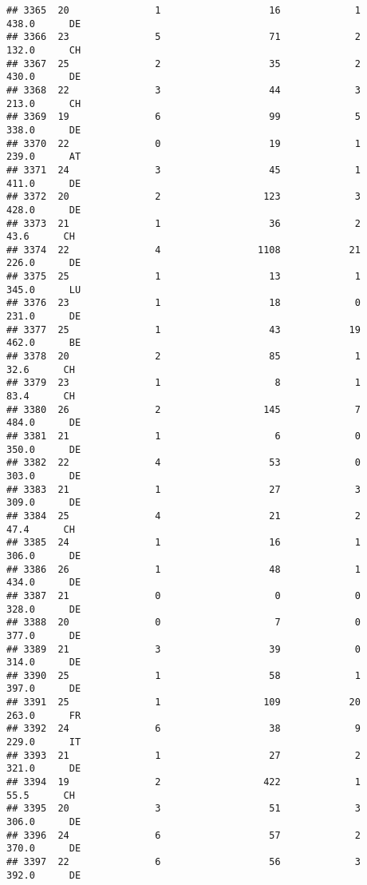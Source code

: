\documentclass[
]{article}
\begin{document}
\begin{verbatim}
## 3365  20               1                   16             1    438.0      DE
## 3366  23               5                   71             2    132.0      CH
## 3367  25               2                   35             2    430.0      DE
## 3368  22               3                   44             3    213.0      CH
## 3369  19               6                   99             5    338.0      DE
## 3370  22               0                   19             1    239.0      AT
## 3371  24               3                   45             1    411.0      DE
## 3372  20               2                  123             3    428.0      DE
## 3373  21               1                   36             2     43.6      CH
## 3374  22               4                 1108            21    226.0      DE
## 3375  25               1                   13             1    345.0      LU
## 3376  23               1                   18             0    231.0      DE
## 3377  25               1                   43            19    462.0      BE
## 3378  20               2                   85             1     32.6      CH
## 3379  23               1                    8             1     83.4      CH
## 3380  26               2                  145             7    484.0      DE
## 3381  21               1                    6             0    350.0      DE
## 3382  22               4                   53             0    303.0      DE
## 3383  21               1                   27             3    309.0      DE
## 3384  25               4                   21             2     47.4      CH
## 3385  24               1                   16             1    306.0      DE
## 3386  26               1                   48             1    434.0      DE
## 3387  21               0                    0             0    328.0      DE
## 3388  20               0                    7             0    377.0      DE
## 3389  21               3                   39             0    314.0      DE
## 3390  25               1                   58             1    397.0      DE
## 3391  25               1                  109            20    263.0      FR
## 3392  24               6                   38             9    229.0      IT
## 3393  21               1                   27             2    321.0      DE
## 3394  19               2                  422             1     55.5      CH
## 3395  20               3                   51             3    306.0      DE
## 3396  24               6                   57             2    370.0      DE
## 3397  22               6                   56             3    392.0      DE

\end{verbatim}
\end{document}

